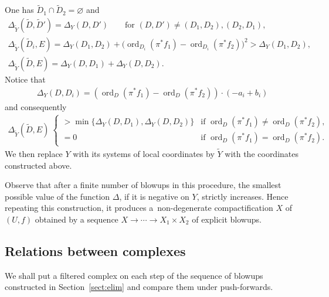\documentclass[pdftex]{sigma}
\newcommand{\cpt}{compactification}
\newcommand{\ord}{\operatorname{ord}}
\begin{document}
One has $\widetilde{D}_1\cap\widetilde{D}_2 = \varnothing$ and
\begin{gather*}
\Delta_{\widetilde{Y}}(\widetilde{D},\widetilde{D}') = \Delta_Y(D,D') \qquad \text{for $(D,D') \neq (D_1,D_2), (D_2,D_1)$}, \\
\Delta_{\widetilde{Y}}(\widetilde{D}_i,E) = \Delta_Y(D_1,D_2) + \big(\ord_{D_i}(\pi^*f_1)-\ord_{D_i}(\pi^*f_2)\big)^2	> \Delta_Y(D_1,D_2), \\
\Delta_{\widetilde{Y}}(\widetilde{D},E)= \Delta_Y(D,D_1) + \Delta_Y(D,D_2).
\end{gather*}
Notice that
\begin{gather*} \Delta_Y(D,D_i) = \left(\ord_D(\pi^*f_1) -\ord_D(\pi^*f_2)\right)\cdot (-a_i+b_i) \end{gather*}
and consequently
\begin{gather*} \Delta_{\widetilde{Y}}(\widetilde{D},E) \ \begin{cases}
> \min\{\Delta_Y(D,D_1),\Delta_Y(D,D_2)\} & \text{if $\ord_D(\pi^*f_1) \neq \ord_D(\pi^*f_2)$}, \\
= 0 & \text{if $\ord_D(\pi^*f_1) = \ord_D(\pi^*f_2)$}.
\end{cases} \end{gather*}
We then replace $Y$ with its systems of local coordinates by $\widetilde{Y}$ with the coordinates constructed above.

Observe that after a finite number of blowups in this procedure, the smallest possible value of the function $\Delta$, if it is negative on $Y$, strictly increases. Hence repeating this construction, it produces a~non-degenerate {\cpt} $X$ of $(U,f)$ obtained by a sequence $X \to\cdots\to X_1\times X_2$ of explicit blowups.

\subsection{Relations between complexes}\label{sect:relations}
We shall put a filtered complex on each step of the sequence of blowups constructed in Section~\ref{sect:elim} and compare them under push-forwards.
\end{document}
